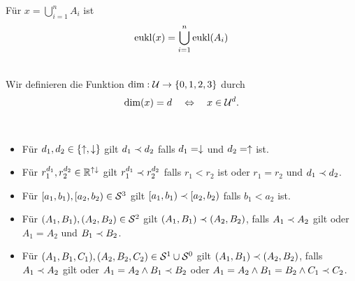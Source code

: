 \begin{dfn}
    Für $x = \bigcup_{i=1}^n A_i$ ist
    \begin{align*}
        \text{eukl}(x) = \bigcup_{i=1}^n \text{eukl}(A_i)
    \end{align*}
\end{dfn}


\begin{dfn}\ \\
    Wir definieren die Funktion $\text{dim} : \mathcal{U} \to \{0,1,2,3\}$ durch
    $$\text{dim}(x) = d \quad \Leftrightarrow \quad x \in \mathcal{U}^d.$$
\end{dfn}



\begin{dfn}\ 
    \begin{itemize}
        \item Für $d_1,d_2 \in \{\uparrow, \downarrow\}$ gilt $d_1 \prec d_2$ falls $d_1 = \downarrow$ und $d_2 = \uparrow$ ist. 
        \item Für $r_1^{d_1},r_2^{d_2} \in \mathbb{R}^{{\uparrow \downarrow}}$ gilt $r_1^{d_1} \prec r_2^{d_2}$ falls $r_1 < r_2$ ist oder $r_1 = r_2$ und $d_1 \prec d_2$.
        \item Für $[a_1,b_1), [a_2,b_2) \in \mathcal{S}^3$ gilt $[a_1,b_1) \prec [a_2,b_2)$ falls $b_1 < a_2$ ist.
        \item Für $(A_1,B_1), (A_2,B_2) \in \mathcal{S}^2$ gilt $(A_1,B_1) \prec (A_2,B_2)$, falls $A_1 \prec A_2$ gilt oder $A_1 = A_2$ und $B_1 \prec B_2$.
        \item Für $(A_1,B_1,C_1), (A_2,B_2,C_2) \in \mathcal{S}^1 \cup \mathcal{S}^0$ gilt $(A_1,B_1) \prec (A_2,B_2)$, falls $A_1 \prec A_2$ gilt oder $A_1 = A_2 \land B_1 \prec B_2$ oder $A_1 = A_2 \land B_1 = B_2 \land C_1 \prec C_2$.
    \end{itemize}
\end{dfn}


